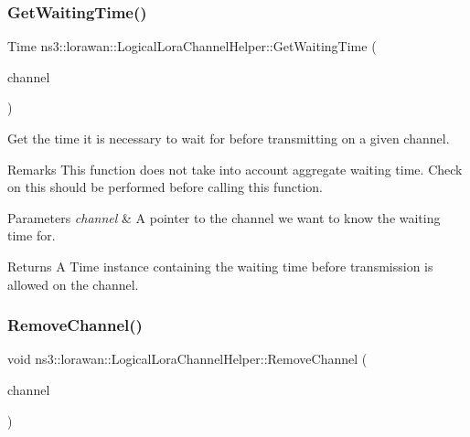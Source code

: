 \subsubsection{\texorpdfstring{Get\+Waiting\+Time()}{GetWaitingTime()}}
{\footnotesize\ttfamily Time ns3\+::lorawan\+::\+Logical\+Lora\+Channel\+Helper\+::\+Get\+Waiting\+Time (\begin{DoxyParamCaption}\item[{Ptr$<$ \hyperlink{classns3_1_1lorawan_1_1LogicalLoraChannel}{Logical\+Lora\+Channel} $>$}]{channel }\end{DoxyParamCaption})}

Get the time it is necessary to wait for before transmitting on a given channel.

\begin{DoxyRemark}{Remarks}
This function does not take into account aggregate waiting time. Check on this should be performed before calling this function.
\end{DoxyRemark}

\begin{DoxyParams}{Parameters}
{\em channel} & A pointer to the channel we want to know the waiting time for. \\
\hline
\end{DoxyParams}
\begin{DoxyReturn}{Returns}
A Time instance containing the waiting time before transmission is allowed on the channel. 
\end{DoxyReturn}
\mbox{\label{classns3_1_1lorawan_1_1LogicalLoraChannelHelper_a0d83beba832f0ead33ff0defb82d2f70}} 
\subsubsection{\texorpdfstring{Remove\+Channel()}{RemoveChannel()}}
{\footnotesize\ttfamily void ns3\+::lorawan\+::\+Logical\+Lora\+Channel\+Helper\+::\+Remove\+Channel (\begin{DoxyParamCaption}\item[{Ptr$<$ \hyperlink{classns3_1_1lorawan_1_1LogicalLoraChannel}{Logical\+Lora\+Channel} $>$}]{channel }\end{DoxyParamCaption})}

